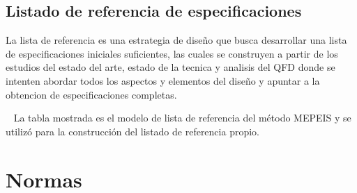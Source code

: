 \subsection{Listado de referencia de especificaciones}

La lista de referencia es una estrategia de diseño que busca desarrollar una lista de especificaciones iniciales suficientes, las cuales se construyen a partir de los estudios del estado del arte, estado de la tecnica y analisis del QFD donde se intenten abordar todos los aspectos y elementos del diseño y apuntar a la obtencion de especificaciones completas. 

~
La tabla mostrada es el modelo de lista de referencia del método MEPEIS y se utilizó para la construcción del listado de referencia propio.


\section{Normas}
